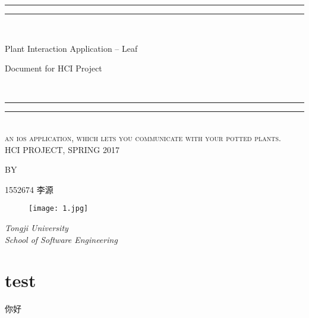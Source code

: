 \documentclass{article}
\begin{document}
\begin{CJK}{UTF8}{gbsn}
\chead{}
\cfoot{\thepage}
\renewcommand{\headrulewidth}{0.4pt}
\renewcommand{\footrulewidth}{0.4pt}

\newcommand*{\titleGP}{\begingroup %
\centering %
\vspace*{\baselineskip} %

\rule{\textwidth}{1.6pt}\vspace*{-\baselineskip}\vspace*{2pt} %
\rule{\textwidth}{0.4pt}\\[\baselineskip] %

{\LARGE Plant Interaction Application -- Leaf
 \\ \vspace{2em} \begin{large} Document for HCI Project \end{large}}\\[0.2\baselineskip] %

\rule{\textwidth}{0.4pt}\vspace*{-\baselineskip}\vspace{3.2pt} %
\rule{\textwidth}{1.6pt}\\[\baselineskip] %

\scshape %
an ios application, which lets you communicate with your potted plants. \\[\baselineskip] %
HCI PROJECT, SPRING 2017\par %

\vspace*{2\baselineskip} %

 BY \\[\baselineskip]
{\Large 1552674 李\quad 源  \par} %


\vspace{20em}
\begin{figure}[!h]
\begin{center}
  \texttt{[image: 1.jpg]}	
\end{center}
\end{figure}
\vfill

{\itshape Tongji University \\ School of Software Engineering \par} %
\endgroup}

\titleGP %
\thispagestyle{empty}
\clearpage

\tableofcontents
\clearpage

\section{test}
你好
\end{CJK}
\end{document}
